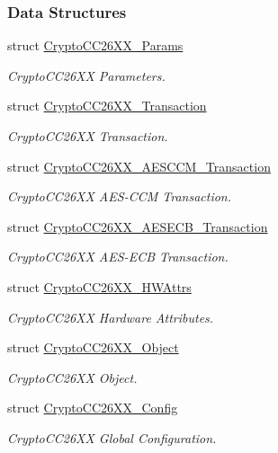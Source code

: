 \subsubsection*{Data Structures}
\begin{DoxyCompactItemize}
\item 
struct \hyperlink{struct_crypto_c_c26_x_x___params}{Crypto\-C\-C26\-X\-X\-\_\-\-Params}
\begin{DoxyCompactList}\small\item\em Crypto\-C\-C26\-X\-X Parameters. \end{DoxyCompactList}\item 
struct \hyperlink{struct_crypto_c_c26_x_x___transaction}{Crypto\-C\-C26\-X\-X\-\_\-\-Transaction}
\begin{DoxyCompactList}\small\item\em Crypto\-C\-C26\-X\-X Transaction. \end{DoxyCompactList}\item 
struct \hyperlink{struct_crypto_c_c26_x_x___a_e_s_c_c_m___transaction}{Crypto\-C\-C26\-X\-X\-\_\-\-A\-E\-S\-C\-C\-M\-\_\-\-Transaction}
\begin{DoxyCompactList}\small\item\em Crypto\-C\-C26\-X\-X A\-E\-S-\/\-C\-C\-M Transaction. \end{DoxyCompactList}\item 
struct \hyperlink{struct_crypto_c_c26_x_x___a_e_s_e_c_b___transaction}{Crypto\-C\-C26\-X\-X\-\_\-\-A\-E\-S\-E\-C\-B\-\_\-\-Transaction}
\begin{DoxyCompactList}\small\item\em Crypto\-C\-C26\-X\-X A\-E\-S-\/\-E\-C\-B Transaction. \end{DoxyCompactList}\item 
struct \hyperlink{struct_crypto_c_c26_x_x___h_w_attrs}{Crypto\-C\-C26\-X\-X\-\_\-\-H\-W\-Attrs}
\begin{DoxyCompactList}\small\item\em Crypto\-C\-C26\-X\-X Hardware Attributes. \end{DoxyCompactList}\item 
struct \hyperlink{struct_crypto_c_c26_x_x___object}{Crypto\-C\-C26\-X\-X\-\_\-\-Object}
\begin{DoxyCompactList}\small\item\em Crypto\-C\-C26\-X\-X Object. \end{DoxyCompactList}\item 
struct \hyperlink{struct_crypto_c_c26_x_x___config}{Crypto\-C\-C26\-X\-X\-\_\-\-Config}
\begin{DoxyCompactList}\small\item\em Crypto\-C\-C26\-X\-X Global Configuration. \end{DoxyCompactList}\end{DoxyCompactItemize}

